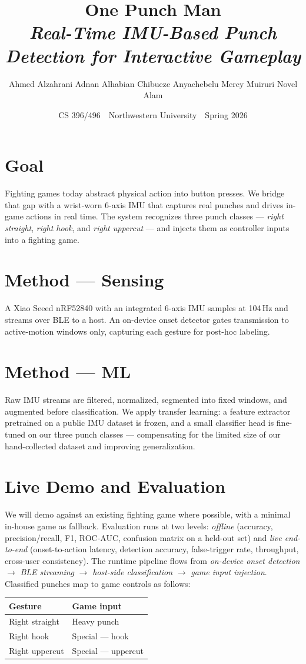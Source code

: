 \documentclass[11pt]{article}
\title{\textbf{One Punch Man}\\[5pt]
  {\large\normalfont\itshape Real-Time IMU-Based Punch Detection for Interactive Gameplay}}
\author{Ahmed Alzahrani \quad Adnan Alhabian \quad Chibueze Anyachebelu \quad Mercy Muiruri \quad Novel Alam}
\date{CS 396/496 \,\textbullet\, Northwestern University \,\textbullet\, Spring 2026}
\begin{document}
\maketitle
\vspace{-1.5em}
\bigbreak
\bigbreak
\bigbreak
\section*{Goal}
Fighting games today abstract physical action into button presses. We bridge that gap with a wrist-worn 6-axis IMU that captures real punches and drives in-game actions in real time. The system recognizes three punch classes --- \emph{right straight}, \emph{right hook}, and \emph{right uppercut} --- and injects them as controller inputs into a fighting game.
\bigbreak
\section*{Method --- Sensing}
A Xiao Seeed nRF52840 with an integrated 6-axis IMU samples at 104\,Hz and streams over BLE to a host. An on-device onset detector gates transmission to active-motion windows only, capturing each gesture for post-hoc labeling.
\bigbreak
\section*{Method --- ML}
Raw IMU streams are filtered, normalized, segmented into fixed windows, and augmented before classification. We apply transfer learning: a feature extractor pretrained on a public IMU dataset is frozen, and a small classifier head is fine-tuned on our three punch classes --- compensating for the limited size of our hand-collected dataset and improving generalization.
\bigbreak
\section*{Live Demo and Evaluation}
We will demo against an existing fighting game where possible, with a minimal in-house game as fallback. Evaluation runs at two levels: \emph{offline} (accuracy, precision/recall, F1, ROC-AUC, confusion matrix on a held-out set) and \emph{live end-to-end} (onset-to-action latency, detection accuracy, false-trigger rate, throughput, cross-user consistency).
The runtime pipeline flows from \emph{on-device onset detection} $\rightarrow$ \emph{BLE streaming} $\rightarrow$ \emph{host-side classification} $\rightarrow$ \emph{game input injection}. Classified punches map to game controls as follows:
\bigbreak
\bigbreak
\bigbreak

\begin{center}
\begin{tabular}{@{}ll@{}}
\toprule
\textbf{Gesture} & \textbf{Game input} \\
\midrule
Right straight & Heavy punch \\
Right hook     & Special --- hook \\
Right uppercut & Special --- uppercut \\
\bottomrule
\end{tabular}
\end{center}
\end{document}
